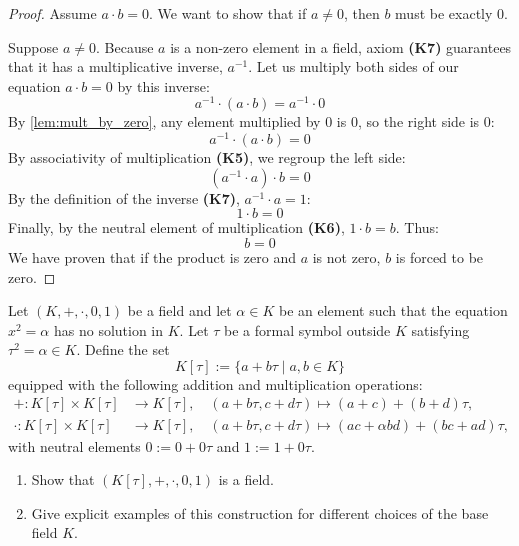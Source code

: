 \begin{proof}
Assume $a \cdot b = 0$. We want to show that if $a \ne 0$, then $b$ must be exactly $0$.

Suppose $a \ne 0$. Because $a$ is a non-zero element in a field, axiom \textbf{(K7)} guarantees that it has a multiplicative inverse, $a^{-1}$. 
Let us multiply both sides of our equation $a \cdot b = 0$ by this inverse:
\[
a^{-1} \cdot (a \cdot b) = a^{-1} \cdot 0
\]
By \cref{lem:mult_by_zero}, any element multiplied by $0$ is $0$, so the right side is $0$:
\[
a^{-1} \cdot (a \cdot b) = 0
\]
By associativity of multiplication \textbf{(K5)}, we regroup the left side:
\[
(a^{-1} \cdot a) \cdot b = 0
\]
By the definition of the inverse \textbf{(K7)}, $a^{-1} \cdot a = 1$:
\[
1 \cdot b = 0
\]
Finally, by the neutral element of multiplication \textbf{(K6)}, $1 \cdot b = b$. Thus:
\[
b = 0
\]
We have proven that if the product is zero and $a$ is not zero, $b$ is forced to be zero.
\end{proof}

\begin{exercise}
\label{exc:quadratic_field_extensions}
Let $(K, +, \cdot, 0, 1)$ be a field and let $\alpha \in K$ be an element such that the equation $x^2 = \alpha$ has no solution in $K$. Let $\tau$ be a formal symbol outside $K$ satisfying $\tau^2 = \alpha \in K$. Define the set
\[
K[\tau] := \{a + b\tau \mid a, b \in K\}
\]
equipped with the following addition and multiplication operations:
\begin{align*}
+ \colon K[\tau] \times K[\tau] &\longrightarrow K[\tau], \quad (a + b\tau, c + d\tau) \longmapsto (a + c) + (b + d)\tau, \\
\cdot \colon K[\tau] \times K[\tau] &\longrightarrow K[\tau], \quad (a + b\tau, c + d\tau) \longmapsto (ac + \alpha bd) + (bc + ad)\tau,
\end{align*}
with neutral elements $0 := 0 + 0\tau$ and $1 := 1 + 0\tau$.
\begin{enumerate}
    \item Show that $(K[\tau], +, \cdot, 0, 1)$ is a field.
    \item Give explicit examples of this construction for different choices of the base field $K$.
\end{enumerate}
\end{exercise}

